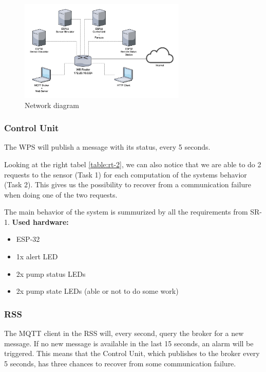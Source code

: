 \documentclass[11pt]{article}
\begin{document}
\begin{figure}[H]
  \centering
  \includegraphics[width=300px]{../diagrams/network-diagram.jpg}
  \caption{Network diagram}
  \label{fig:network-diagram}
\end{figure}

\subsubsection{Control Unit}

The WPS will publish a message with its status, every 5 seconds.

Looking at the right tabel \ref{table:rt-2}, we can also notice that we are able to do 2 requests to the sensor (Task 1) for each computation of the systems behavior (Task 2). This gives us the possibility to recover from a communication failure when doing one of the two requests.

The main behavior of the system is summurized by all the requirements from SR-1.
\newline
\newline
\noindent
\textbf{Used hardware:}
\begin{itemize}
	\item ESP-32
	\item 1x alert LED
	\item 2x pump status LEDs
	\item 2x pump state LEDs (able or not to do some work)
\end{itemize}

\subsubsection{RSS}

The MQTT client in the RSS will, every second, query the broker for a new message. If no new message is available in the last 15 seconds, an alarm will be triggered. This means that the Control Unit, which publishes to the broker every 5 seconds, has three chances to recover from some communication failure. 
\end{document}
